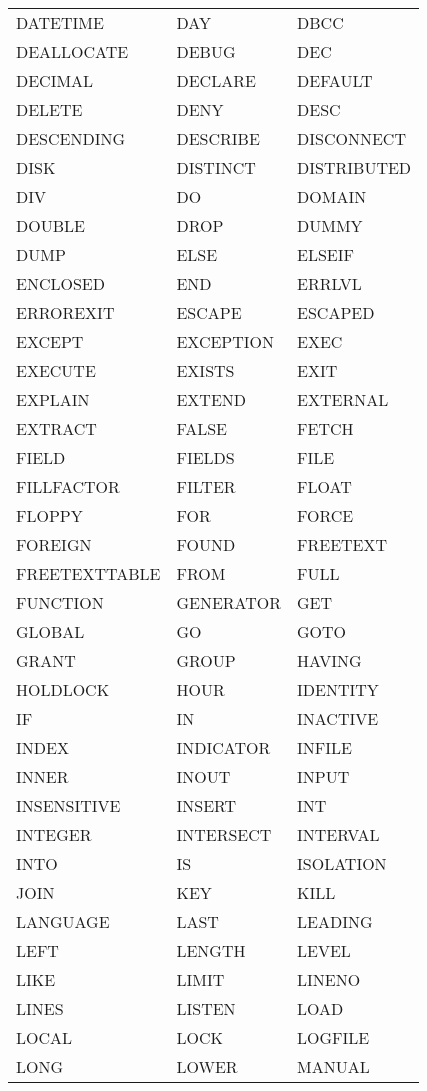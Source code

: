 \begin{longtable}{m{120pt}m{120pt}m{120pt}}
DATETIME					&DAY				&DBCC\\
DEALLOCATE				&DEBUG			&	DEC\\
DECIMAL					&DECLARE			&DEFAULT\\
DELETE						&DENY				&DESC\\
DESCENDING				&DESCRIBE			&DISCONNECT\\
DISK						&DISTINCT			&DISTRIBUTED\\
DIV							&DO				&	DOMAIN\\
DOUBLE					&DROP				&DUMMY\\
DUMP						&ELSE				&ELSEIF\\
ENCLOSED					&END				&ERRLVL\\
ERROREXIT					&ESCAPE			&	ESCAPED\\
EXCEPT						&EXCEPTION		&	EXEC\\
EXECUTE					&EXISTS			&	EXIT\\
EXPLAIN					&EXTEND			&EXTERNAL\\
EXTRACT					&FALSE				&FETCH\\
FIELD						&FIELDS			&	FILE\\
FILLFACTOR					&FILTER			&	FLOAT\\
FLOPPY						&FOR				&FORCE\\
FOREIGN					&FOUND			&	FREETEXT\\
FREETEXTTABLE				&FROM				&FULL\\
FUNCTION					&GENERATOR		&GET\\
GLOBAL					&GO				&	GOTO\\
GRANT						&GROUP			&	HAVING\\
HOLDLOCK					&HOUR				&IDENTITY\\
IF							&IN					&INACTIVE\\
INDEX						&INDICATOR		&	INFILE\\
INNER						&INOUT			&	INPUT\\
INSENSITIVE				&INSERT			&	INT\\
INTEGER					&INTERSECT		&	INTERVAL\\
INTO						&IS					&ISOLATION\\
JOIN						&KEY				&	KILL\\
LANGUAGE					&LAST				&LEADING\\
LEFT						&LENGTH			&LEVEL\\
LIKE						&LIMIT				&LINENO\\
LINES						&LISTEN			&	LOAD\\
LOCAL						&LOCK				&LOGFILE\\
LONG						&LOWER			&	MANUAL\\

\end{longtable}

